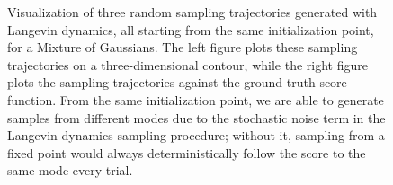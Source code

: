 \begin{figure}
  \centering
  \caption{Visualization of three random sampling trajectories generated with Langevin dynamics, all starting from the same initialization point, for a Mixture of Gaussians.  The left figure plots these sampling trajectories on a three-dimensional contour, while the right figure plots the sampling trajectories against the ground-truth score function.  From the same initialization point, we are able to generate samples from different modes due to the stochastic noise term in the Langevin dynamics sampling procedure; without it, sampling from a fixed point would always deterministically follow the score to the same mode every trial.}
  \label{fig:langevin_sample}
\end{figure}


